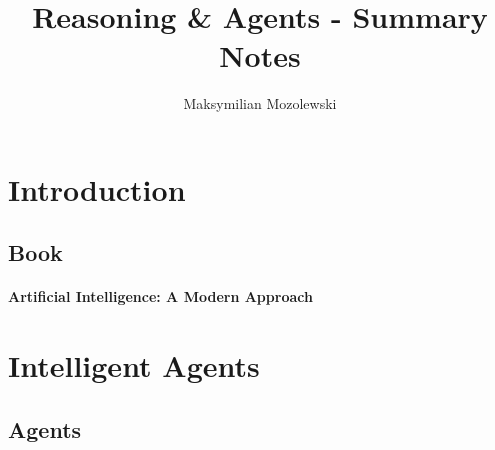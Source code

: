 \documentclass{article}
\begin{document}
\title{Reasoning \& Agents - Summary Notes}
\author{Maksymilian Mozolewski}
\maketitle
\pagebreak
\tableofcontents
\pagebreak


\section{Introduction}
\subsection{Book}
\paragraph{Artificial Intelligence: A Modern Approach}

\section{Intelligent Agents}

\subsection{Agents}
\end{document}
